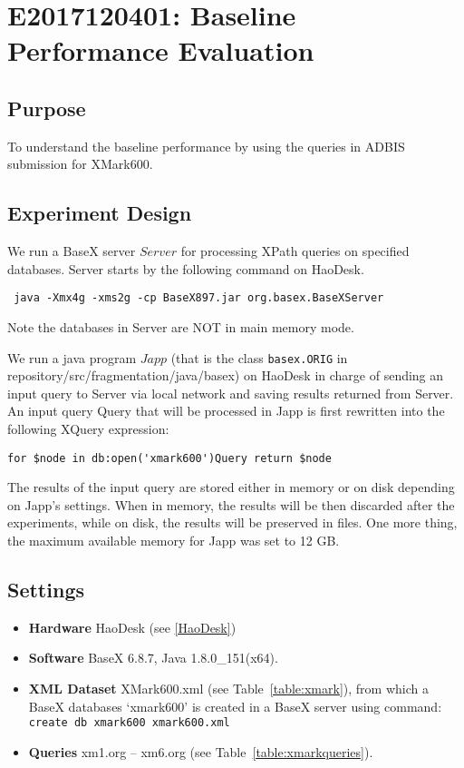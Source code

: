 \section{E2017120401: Baseline Performance Evaluation}
 
\subsection{Purpose}
To understand the baseline performance by using
the queries in ADBIS submission for XMark600. 

\subsection{Experiment Design}  

We run a BaseX server $Server$ for processing XPath queries on specified 
databases. Server starts by the following command on HaoDesk.

\verb| java -Xmx4g -xms2g -cp BaseX897.jar org.basex.BaseXServer|

Note the databases in Server are NOT in main memory mode.

We run a java program $Japp$ (that is the class \texttt{basex.ORIG} 
in repository/src/fragmentation/java/basex)
on HaoDesk in charge of sending an input query to
Server via local network and saving results returned from Server. An input query 
Query that will be processed in Japp is first rewritten into the following XQuery expression:

\verb|for $node in db:open('xmark600')Query return $node|

The results of the input query are stored either in memory or on disk depending on Japp's settings. When in memory, the results will be then discarded after the
experiments, while on disk, the results will be preserved in files. One more thing, the maximum available memory for Japp was set to 12 GB.

\subsection{Settings} 

\begin{itemize}
	
	\item \textbf{Hardware} HaoDesk (see \ref{HaoDesk})\\
	\item \textbf{Software} BaseX 6.8.7, Java 1.8.0\_151(x64).\\
	\item \textbf{XML Dataset} XMark600.xml (see Table~\ref{table:xmark}), 
	from which a BaseX databases `xmark600' is created in a BaseX server using command:\\
	\verb|create db xmark600 xmark600.xml|
	\item \textbf{Queries} xm1.org -- xm6.org (see Table~\ref{table:xmarkqueries}).
	
\end{itemize}


